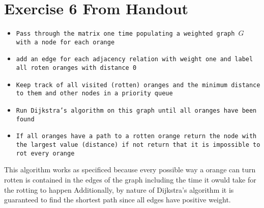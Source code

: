 \documentclass{amsart}
\begin{document}
\section{Exercise 6 From Handout}
{\small
    \begin{itemize}
        \item \texttt{Pass through the matrix one time populating a weighted graph $G$  with a node for each orange}
        \item \texttt{add an edge for each adjacency relation with weight one and label all roten oranges with distance 0}
        \item \texttt{Keep track of all visited (rotten) oranges and the minimum distance to them and other nodes in a priority queue}
        \item \texttt{Run Dijkstra's algorithm on this graph until all oranges have been found}
        \item \texttt{If all oranges have a path to a rotten orange return the node with the largest value (distance) if not return that it is impossible
            to rot every orange}
    \end{itemize}
}
This algorithm works as specificed because every possible way a orange can turn rotten is contained in the edges of the graph including the time it owuld take for the rotting to happen
Additionally, by nature of Dijkstra's algorithm it is guaranteed to find the shortest path since all edges have positive weight.
\end{document}

